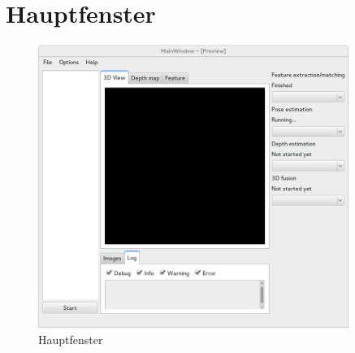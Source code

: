 
\section{Hauptfenster}

\begin{figure}[h]
	\centering
	\includegraphics[width=0.9\textwidth]{img/Screenshot.png}
	\caption{Hauptfenster}
	\label{fig:Hauptfenster}
\end{figure}

